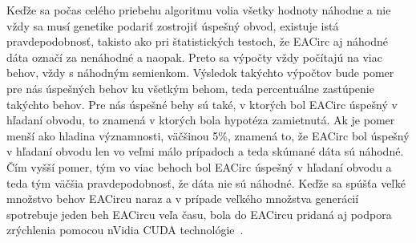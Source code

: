 Keďže sa počas celého priebehu algoritmu volia všetky hodnoty náhodne a nie vždy sa musí genetike podariť zostrojiť úspešný obvod, existuje istá pravdepodobnosť, takisto ako pri štatistických testoch, že EACirc aj náhodné dáta označí za nenáhodné a naopak. Preto sa výpočty vždy počítajú na viac behov, vždy s náhodným semienkom. Výsledok takýchto výpočtov bude pomer pre nás úspešných behov ku všetkým behom, teda percentuálne zastúpenie takýchto behov. Pre nás úspešné behy sú také, v ktorých bol EACirc úspešný v hľadaní obvodu, to znamená v ktorých bola hypotéza zamietnutá. Ak je pomer menší ako hladina významnosti, väčšinou 5\%, znamená to, že EACirc bol úspešný v hľadaní obvodu len vo veľmi málo prípadoch a teda skúmané dáta sú náhodné. Čím vyšší pomer, tým vo viac behoch bol EACirc úspešný v hľadaní obvodu a teda tým väčšia pravdepodobnosť, že dáta nie sú náhodné. Keďže sa spúšťa veľké množstvo behov EACircu naraz a v prípade veľkého množstva generácií spotrebuje jeden beh EACircu veľa času, bola do EACircu pridaná aj podpora zrýchlenia pomocou {nVidia CUDA technológie}~\parencite{novotny-bc}.



